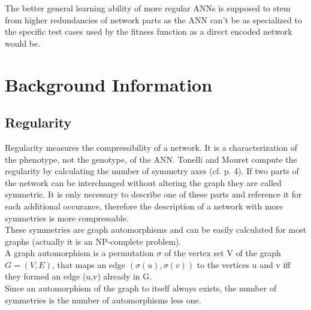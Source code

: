 \documentclass[12pt,twoside]{article}
\theoremstyle{plain}
\theoremstyle{definition}
\theoremstyle{remark}
\begin{document}
The better general learning ability of more regular ANNs is supposed to stem from higher redundancies of network parts as the ANN can't be as specialized to the specific test cases used by the fitness function as a direct encoded network would be.


\section{Background Information}
\label{sec:background}

\subsection{Regularity}
\label{regularity}
Regularity measures the compressibility of a network. It is a characterization of the phenotype, not the genotype, of the ANN.
Tonelli and Mouret compute the regularity by calculating the number of symmetry axes (cf. \cite{citeulike:12788284} p. 4).
If two parts of the network can be interchanged without altering the graph they are called symmetric.
It is only necessary to describe one of these parts and reference it for each additional occurance, therefore the description of a network with more symmetries is more compressable.\\
These symmetries are graph automorphisms and can be easily calculated for most graphs (actually it is an NP-complete problem).\\
A graph automorphism is a permutation $\sigma$ of the vertex set V of the graph $G = (V,E)$, that maps an edge $(\sigma(u),\sigma(v))$ to the vertices u and v iff they formed an edge (u,v) already in G.\\
Since an automorphism of the graph to itself always exists, the number of symmetries is the number of automorphisms less one.\medskip
\end{document}
